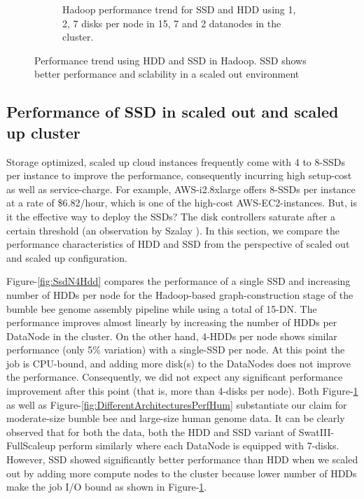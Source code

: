 \documentclass[conference]{IEEEtran}
\begin{document}
\begin{figure}[h]
\begin{subfigure}[b]{0.23\textwidth}
          \caption{Hadoop performance trend for SSD and HDD using 1, 2, 7 disks per node in 15, 7 and 2 datanodes in the cluster.}
          \label{fig:SsdNHddDiffNodes}
  \end{subfigure}
  \caption{Performance trend using HDD and SSD in Hadoop. SSD shows better performance and sclability in a scaled out environment}
  \label{fig:SsdNHdd}
  \vspace{-.8em}
\end{figure}
\subsection {Performance of SSD in scaled out and scaled up cluster} \label{ScaledupClusterAndSSD}
Storage optimized, scaled up cloud instances frequently come with 4 to 8-SSDs per instance to improve the performance, consequently incurring high setup-cost as well as service-charge. For example, AWS-i2.8xlarge offers 8-SSDs per instance at a rate of \$6.82/hour, which is one of the high-cost AWS-EC2-instances. But, is it the effective way to deploy the SSDs? The disk controllers saturate after a certain threshold (an observation by Szalay \cite{cluster:AmdahlBalancedBlade}). In this section, we compare the performance characteristics of HDD and SSD from the perspective of scaled out and scaled up configuration.

Figure-\ref{fig:SsdN4Hdd} compares the performance of a single SSD and increasing number of HDDs per node for the Hadoop-based graph-construction stage of the bumble bee genome assembly pipeline while using a total of 15-DN. The performance improves almost linearly by increasing the number of HDDs per DataNode in the cluster. On the other hand, 4-HDDs per node shows similar performance (only 5\% variation) with a single-SSD per node.
At this point the job is CPU-bound, and adding more disk(s) to the DataNodes does not improve the performance. Consequently, we did not expect any significant performance improvement after this point (that is, more than 4-disks per node). Both Figure-\ref{fig:SsdNHddDiffNodes} as well as Figure-\ref{fig:DifferentArchitecturesPerfHum} substantiate our claim for moderate-size bumble bee and large-size human genome data. It can be clearly observed that for both the data, both the HDD and SSD variant of SwatIII-FullScaleup perform similarly where each DataNode is equipped with 7-disks. However, SSD showed significantly better performance than HDD when we scaled out by adding more compute nodes to the cluster because lower number of HDDs make the job I/O bound as shown in Figure-\ref{fig:SsdNHddDiffNodes}.
\end{document}
